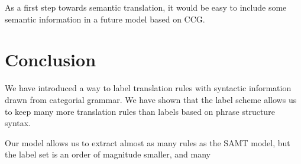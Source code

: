 \documentclass{article}
\begin{document}
As a first step towards semantic translation, it would be easy to include some semantic information in a future model based on CCG. 

\section{Conclusion}

We have introduced a way to label translation rules with syntactic information drawn from categorial grammar. We have shown that the label scheme allows us to keep many more translation rules than labels based on phrase structure syntax.

Our model allows us to extract almost as many rules as the SAMT model, but the label set is an order of magnitude smaller, and many




\end{document}
